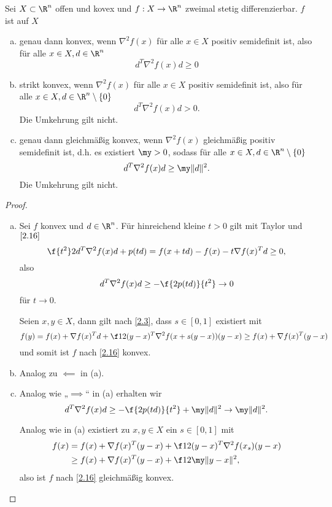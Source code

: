 \begin{st} \label{2.17}
	Sei $X \subset \R^n$ offen und kovex und $f: X \to \R^n$ zweimal stetig differenzierbar.
	$f$ ist auf $X$
	\begin{enumerate}[(a)]
		\item
			genau dann konvex, wenn $\nabla^2 f(x)$ für alle $x \in X$ positiv semidefinit ist, also für alle $x \in X, d \in \R^n$
			\[
				d^T \nabla^2 f(x) d \ge 0
			\]
		\item
			strikt konvex, wenn $\nabla^2 f(x)$ für alle $x \in X$ positiv semidefinit ist, also für alle $x \in X, d \in \R^n \setminus \{0\}$
			\[
				d^T \nabla^2 f(x) d > 0.
			\]
			Die Umkehrung gilt nicht.
		\item
			genau dann gleichmäßig konvex, wenn $\nabla^2 f(x)$ gleichmäßig positiv semidefinit ist, d.h. es existiert $\my > 0$, sodass für alle $x \in X, d \in \R^n \setminus \{0\}$
			\[
				d^T \nabla^2 f(x) d \ge \my \|d\|^2.
			\]
			Die Umkehrung gilt nicht.
	\end{enumerate}
	\begin{proof}
		\begin{enumerate}[(a)]
			\item
				\begin{seg}[„$\implies$“]
					Sei $f$ konvex und $d \in \R^n$.
					Für hinreichend kleine $t > 0$ gilt mit Taylor und $\ref{2.16}$
					\[
						\f {t^2}2 d^T \nabla^2 f(x) d + p(td)
						= f(x+td) - f(x) - t \nabla f(x)^T d
						\ge 0,
					\]
					also
					\[
						d^T \nabla^2 f(x) d
						\ge - \f {2 p(td)}{t^2} \to 0
					\]
					für $t \to 0$.
				\end{seg}
				\begin{seg}[$\impliedby$]
					Seien $x,y \in X$, dann gilt nach \ref{2.3}, dass $s \in [0,1]$ existiert mit
					\[
						f(y)
						= f(x) + \nabla f(x)^T d  + \f 12 (y-x)^T \nabla^2 f(x+s(y-x))(y-x)
						\ge f(x) + \nabla f(x)^T (y-x)
					\]
					und somit ist $f$ nach \ref{2.16} konvex.
				\end{seg}
			\item
				Analog zu $\impliedby$ in (a).
			\item
				\begin{seg}[„$\implies$“]
					Analog wie „$\implies$“ in (a) erhalten wir
					\[
						d^T \nabla^2 f(x) d
						\ge - \f {2 p(td)}{t^2} + \my \|d\|^2
						\to \my \|d\|^2.
					\]
				\end{seg}
				\begin{seg}[„$\impliedby$“]
					Analog wie in (a) existiert zu $x,y \in X$ ein $s \in [0,1]$ mit
					\begin{align*}
						f(x)
						&= f(x) + \nabla f(x)^T (y-x) + \f 12 (y-x)^T \nabla^2 f(x_s) (y-x) \\
						&\ge f(x) + \nabla f(x)^T (y-x) + \f 12 \my \|y-x\|^2,
					\end{align*}
					also ist $f$ nach \ref{2.16} gleichmäßig konvex.
				\end{seg}
		\end{enumerate}
	\end{proof}
\end{st}

